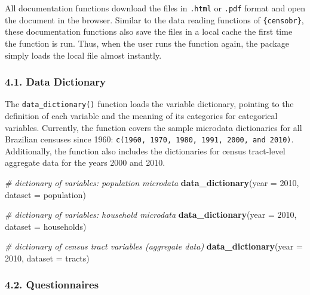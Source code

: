 \documentclass[
]{article}
\newenvironment{Shaded}{\begin{snugshade}}{\end{snugshade}}
\newcommand{\AttributeTok}[1]{\textcolor[rgb]{0.13,0.29,0.53}{#1}}
\newcommand{\CommentTok}[1]{\textcolor[rgb]{0.56,0.35,0.01}{\textit{#1}}}
\newcommand{\DecValTok}[1]{\textcolor[rgb]{0.00,0.00,0.81}{#1}}
\newcommand{\FunctionTok}[1]{\textcolor[rgb]{0.13,0.29,0.53}{\textbf{#1}}}
\newcommand{\NormalTok}[1]{#1}
\newcommand{\StringTok}[1]{\textcolor[rgb]{0.31,0.60,0.02}{#1}}
\begin{document}
All documentation functions download the files in \texttt{.html} or
\texttt{.pdf} format and open the document in the browser. Similar to
the data reading functions of \texttt{\{censobr\}}, these documentation
functions also save the files in a local cache the first time the
function is run. Thus, when the user runs the function again, the
package simply loads the local file almost instantly.

\subsubsection{4.1. Data Dictionary}\label{data-dictionary}

The \texttt{data\_dictionary()} function loads the variable dictionary,
pointing to the definition of each variable and the meaning of its
categories for categorical variables. Currently, the function covers the
sample microdata dictionaries for all Brazilian censuses since 1960:
\texttt{c(1960,\ 1970,\ 1980,\ 1991,\ 2000,\ and\ 2010)}. Additionally,
the function also includes the dictionaries for census tract-level
aggregate data for the years 2000 and 2010.

\begin{Shaded}
\begin{Highlighting}[]
\CommentTok{\# dictionary of variables: population microdata}
\FunctionTok{data\_dictionary}\NormalTok{(}\AttributeTok{year =} \DecValTok{2010}\NormalTok{, }
                \AttributeTok{dataset =} \StringTok{\textquotesingle{}population\textquotesingle{}}\NormalTok{)}

\CommentTok{\# dictionary of variables: household microdata}
\FunctionTok{data\_dictionary}\NormalTok{(}\AttributeTok{year =} \DecValTok{2010}\NormalTok{, }
                \AttributeTok{dataset =} \StringTok{\textquotesingle{}households\textquotesingle{}}\NormalTok{)}

\CommentTok{\# dictionary of census tract variables (aggregate data)}
\FunctionTok{data\_dictionary}\NormalTok{(}\AttributeTok{year =} \DecValTok{2010}\NormalTok{, }
                \AttributeTok{dataset =} \StringTok{\textquotesingle{}tracts\textquotesingle{}}\NormalTok{)}
\end{Highlighting}
\end{Shaded}

\subsubsection{4.2. Questionnaires}\label{questionnaires}
\end{document}
